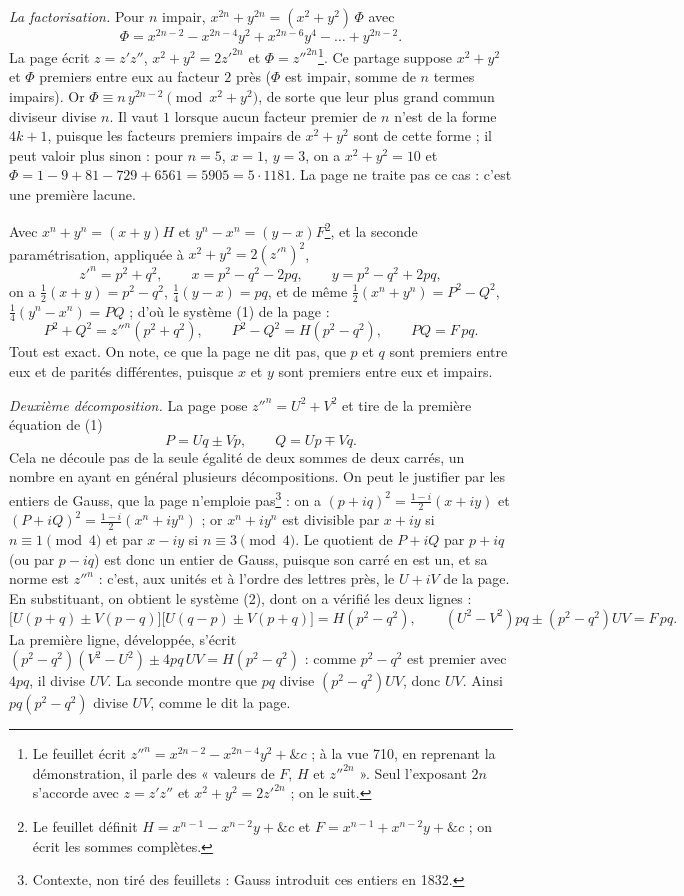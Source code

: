 \documentclass[11pt,a4paper]{article}
\begin{document}
\emph{La factorisation.} Pour $n$ impair, $x^{2n}+y^{2n}=(x^2+y^2)\,\Phi$ avec
\[ \Phi=x^{2n-2}-x^{2n-4}y^2+x^{2n-6}y^4-\dots+y^{2n-2}. \]
La page écrit $z=z'z''$, $x^2+y^2=2z'^{2n}$ et $\Phi=z''^{2n}$\footnote{Le feuillet écrit $z''^n=x^{2n-2}-x^{2n-4}y^2+\&c$ ; à la vue 710, en reprenant la démonstration, il parle des « valeurs de $F$, $H$ et $z''^{2n}$ ». Seul l'exposant $2n$ s'accorde avec $z=z'z''$ et $x^2+y^2=2z'^{2n}$ ; on le suit.}. Ce partage suppose $x^2+y^2$ et $\Phi$ premiers entre eux au facteur $2$ près ($\Phi$ est impair, somme de $n$ termes impairs). Or $\Phi\equiv n\,y^{2n-2}\pmod{x^2+y^2}$, de sorte que leur plus grand commun diviseur divise $n$. Il vaut $1$ lorsque aucun facteur premier de $n$ n'est de la forme $4k+1$, puisque les facteurs premiers impairs de $x^2+y^2$ sont de cette forme ; il peut valoir plus sinon : pour $n=5$, $x=1$, $y=3$, on a $x^2+y^2=10$ et $\Phi=1-9+81-729+6561=5905=5\cdot 1181$. La page ne traite pas ce cas : c'est une première lacune.

Avec $x^n+y^n=(x+y)H$ et $y^n-x^n=(y-x)F$\footnote{Le feuillet définit $H=x^{n-1}-x^{n-2}y+\&c$ et $F=x^{n-1}+x^{n-2}y+\&c$ ; on écrit les sommes complètes.}, et la seconde paramétrisation, appliquée à $x^2+y^2=2(z'^n)^2$,
\[ z'^n=p^2+q^2,\qquad x=p^2-q^2-2pq,\qquad y=p^2-q^2+2pq, \]
on a $\tfrac12(x+y)=p^2-q^2$, $\tfrac14(y-x)=pq$, et de même $\tfrac12(x^n+y^n)=P^2-Q^2$, $\tfrac14(y^n-x^n)=PQ$ ; d'où le système (1) de la page :
\[ P^2+Q^2=z''^n(p^2+q^2),\qquad P^2-Q^2=H(p^2-q^2),\qquad PQ=F\,pq. \]
Tout est exact. On note, ce que la page ne dit pas, que $p$ et $q$ sont premiers entre eux et de parités différentes, puisque $x$ et $y$ sont premiers entre eux et impairs.

\emph{Deuxième décomposition.} La page pose $z''^n=U^2+V^2$ et tire de la première équation de (1)
\[ P=Uq\pm Vp,\qquad Q=Up\mp Vq. \]
Cela ne découle pas de la seule égalité de deux sommes de deux carrés, un nombre en ayant en général plusieurs décompositions. On peut le justifier par les entiers de Gauss, que la page n'emploie pas\footnote{Contexte, non tiré des feuillets : Gauss introduit ces entiers en 1832.} : on a $(p+iq)^2=\tfrac{1-i}{2}(x+iy)$ et $(P+iQ)^2=\tfrac{1-i}{2}(x^n+iy^n)$ ; or $x^n+iy^n$ est divisible par $x+iy$ si $n\equiv 1\pmod 4$ et par $x-iy$ si $n\equiv 3\pmod 4$. Le quotient de $P+iQ$ par $p+iq$ (ou par $p-iq$) est donc un entier de Gauss, puisque son carré en est un, et sa norme est $z''^n$ : c'est, aux unités et à l'ordre des lettres près, le $U+iV$ de la page. En substituant, on obtient le système (2), dont on a vérifié les deux lignes :
\[ \bigl[U(p+q)\pm V(p-q)\bigr]\bigl[U(q-p)\pm V(p+q)\bigr]=H(p^2-q^2),\qquad (U^2-V^2)pq\pm(p^2-q^2)UV=F\,pq. \]
La première ligne, développée, s'écrit $(p^2-q^2)(V^2-U^2)\pm 4pq\,UV=H(p^2-q^2)$ : comme $p^2-q^2$ est premier avec $4pq$, il divise $UV$. La seconde montre que $pq$ divise $(p^2-q^2)UV$, donc $UV$. Ainsi $pq(p^2-q^2)$ divise $UV$, comme le dit la page.
\end{document}
